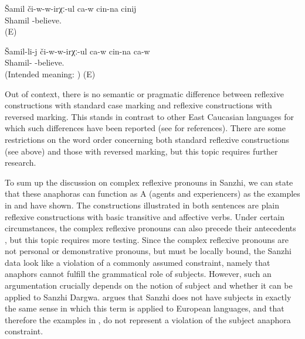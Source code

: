 \begin{exe}
	\ex	\label{ex:Rasul is believing in himself@13}
	\begin{xlist}
		\ex	\label{ex:Rasul is believing in himself@13A}
		\gll	Šamil	či-w-w-irχː-ul ca-w	cin-na	cinij\\
			Shamil	-believe.  	\\
		\glt	{} (E)

		\ex	\label{ex:Rasul is believing in himself@13B}
		\gll {*} Šamil-li-j	či-w-w-irχː-ul ca-w	cin-na	ca-w	\\
		{}	Shamil-	-believe.  	\\
		\glt	 (Intended meaning: ) (E)
	\end{xlist}
\end{exe}


Out of context, there is no semantic or pragmatic difference between reflexive constructions with standard case marking and reflexive constructions with reversed marking. This stands in contrast to other East Caucasian languages for which such differences have been reported (see \citealp{Forker2014} for references). There are some restrictions on the word order concerning both standard reflexive constructions (see above) and those with reversed marking, but this topic requires further research.
%

To sum up the discussion on complex reflexive pronouns in Sanzhi, we can state that these anaphoras can function as A (agents and experiencers) as the examples in  and  have shown. The constructions illustrated in both sentences are plain reflexive constructions with basic transitive and affective verbs. Under certain circumstances, the complex reflexive pronouns can also precede their antecedents , but this topic requires more testing. Since the complex reflexive pronouns are not personal or demonstrative pronouns, but must be locally bound, the Sanzhi data look like a violation of a commonly assumed constraint, namely that anaphors cannot fulfill the grammatical role of subjects. However, such an argumentation crucially depends on the notion of subject and whether it can be applied to Sanzhi Dargwa. \citet{Forker2014} argues that Sanzhi does not have subjects in exactly the same sense in which this term is applied to European languages, and that therefore the examples in ,  do not represent a violation of the subject anaphora constraint.


